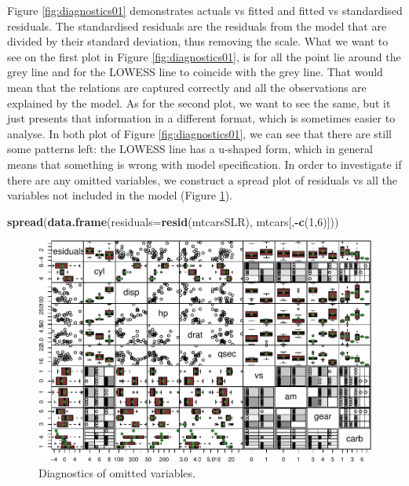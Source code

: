 \documentclass[
]{book}
\newenvironment{Shaded}{\begin{snugshade}}{\end{snugshade}}
\newcommand{\AttributeTok}[1]{\textcolor[rgb]{0.13,0.29,0.53}{#1}}
\newcommand{\DecValTok}[1]{\textcolor[rgb]{0.00,0.00,0.81}{#1}}
\newcommand{\FunctionTok}[1]{\textcolor[rgb]{0.13,0.29,0.53}{\textbf{#1}}}
\newcommand{\NormalTok}[1]{#1}
\newcommand{\SpecialCharTok}[1]{\textcolor[rgb]{0.81,0.36,0.00}{\textbf{#1}}}
\theoremstyle{definition}
\theoremstyle{definition}
\theoremstyle{definition}
\theoremstyle{definition}
\theoremstyle{remark}
\begin{document}
Figure \ref{fig:diagnostics01} demonstrates actuals vs fitted and fitted vs standardised residuals. The standardised residuals are the residuals from the model that are divided by their standard deviation, thus removing the scale. What we want to see on the first plot in Figure \ref{fig:diagnostics01}, is for all the point lie around the grey line and for the LOWESS line to coincide with the grey line. That would mean that the relations are captured correctly and all the observations are explained by the model. As for the second plot, we want to see the same, but it just presents that information in a different format, which is sometimes easier to analyse. In both plot of Figure \ref{fig:diagnostics01}, we can see that there are still some patterns left: the LOWESS line has a u-shaped form, which in general means that something is wrong with model specification. In order to investigate if there are any omitted variables, we construct a spread plot of residuals vs all the variables not included in the model (Figure \ref{fig:diagnostics02}).

\begin{Shaded}
\begin{Highlighting}[]
\FunctionTok{spread}\NormalTok{(}\FunctionTok{data.frame}\NormalTok{(}\AttributeTok{residuals=}\FunctionTok{resid}\NormalTok{(mtcarsSLR), mtcars[,}\SpecialCharTok{{-}}\FunctionTok{c}\NormalTok{(}\DecValTok{1}\NormalTok{,}\DecValTok{6}\NormalTok{)]))}
\end{Highlighting}
\end{Shaded}

\begin{figure}
\centering
\includegraphics{Svetunkov---Statistics-for-Business-Analytics_files/figure-latex/diagnostics02-1.pdf}
\caption{\label{fig:diagnostics02}Diagnostics of omitted variables.}
\end{figure}
\end{document}
